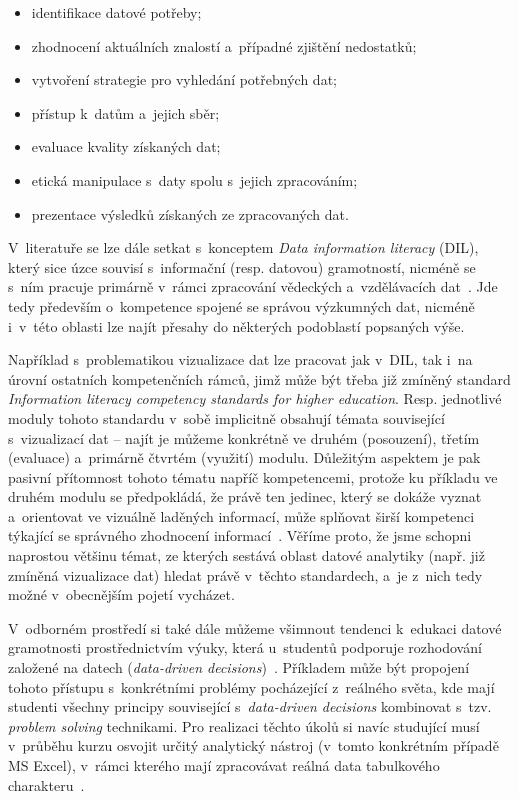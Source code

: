 \begin{itemize}
\tightlist
\item
  identifikace datové potřeby;
\item
  zhodnocení aktuálních znalostí a~případné zjištění nedostatků;
\item
  vytvoření strategie pro vyhledání potřebných dat;
\item
  přístup k~datům a~jejich sběr;
\item
  evaluace kvality získaných dat;
\item
  etická manipulace s~daty spolu s~jejich zpracováním;
\item
  prezentace výsledků získaných ze zpracovaných dat.
\end{itemize}

V~literatuře se lze dále setkat s~konceptem \emph{Data information literacy} (DIL), který sice úzce souvisí s~informační (resp. datovou) gramotností, nicméně se s~ním pracuje primárně v~rámci zpracování vědeckých a~vzdělávacích dat~\parencite{jeffryes13}. Jde tedy především o~kompetence spojené se správou výzkumných dat, nicméně i~v~této oblasti lze najít přesahy do některých podoblastí popsaných výše.

Například s~problematikou vizualizace dat lze pracovat jak v~DIL, tak i~na úrovní ostatních kompetenčních rámců, jimž může být třeba již zmíněný standard \emph{Information literacy competency standards for higher education}. Resp. jednotlivé moduly tohoto standardu v~sobě implicitně obsahují témata související s~vizualizací dat -- najít je můžeme konkrétně ve druhém (posouzení), třetím (evaluace) a~primárně čtvrtém (využití) modulu. Důležitým aspektem je pak pasivní přítomnost tohoto tématu napříč kompetencemi, protože ku příkladu ve druhém modulu se předpokládá, že právě ten jedinec, který se dokáže vyznat a~orientovat ve vizuálně laděných informací, může splňovat širší kompetenci týkající se správného zhodnocení informací~\parencite{womack14}. Věříme proto, že jsme schopni naprostou většinu témat, ze kterých sestává oblast datové analytiky (např. již zmíněná vizualizace dat) hledat právě v~těchto standardech, a~je z~nich tedy možné v~obecnějším pojetí vycházet.

V~odborném prostředí si také dále můžeme všimnout tendenci k~edukaci datové gramotnosti prostřednictvím výuky, která u~studentů podporuje rozhodování založené na datech (\emph{data-driven decisions})~\parencite{mandinach13}. Příkladem může být propojení tohoto přístupu s~konkrétními problémy pocházející z~reálného světa, kde mají studenti všechny principy související s~\emph{data-driven decisions} kombinovat s~tzv. \emph{problem solving} technikami. Pro realizaci těchto úkolů si navíc studující musí v~průběhu kurzu osvojit určitý analytický nástroj (v~tomto konkrétním případě MS Excel), v~rámci kterého mají zpracovávat reálná data tabulkového charakteru~\parencite{slayter17}.

